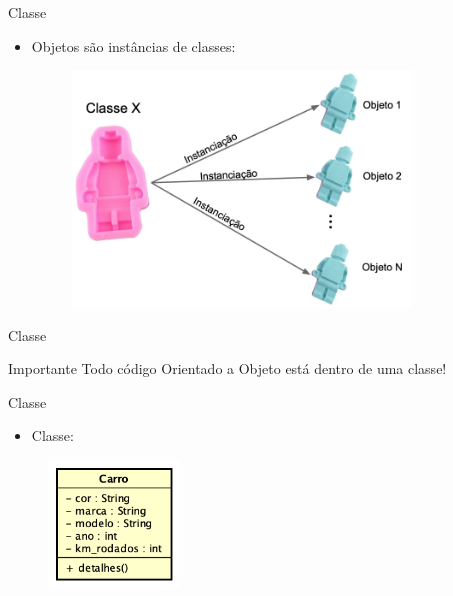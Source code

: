 \documentclass{beamer}
\begin{document}
\begin{frame}{Classe}
    \begin{itemize}
        \item Objetos são instâncias de classes:
        \begin{figure}[H]
            \includegraphics[width=9cm]{Theme/Logos/exemplo2_classe_instancia.png}
        \end{figure}
    \end{itemize}
\end{frame}

\begin{frame}{Classe}
    \large
    \begin{block}{Importante}
        Todo código Orientado a Objeto está dentro de uma classe!
    \end{block}
\end{frame}

\begin{frame}{Classe}
    \begin{itemize}
        \item Classe:
    \end{itemize}
    \begin{figure}[H]
        \includegraphics[width=3.5cm]{Theme/Logos/classe_carro.png}
    \end{figure}
\end{frame}
\end{document}

